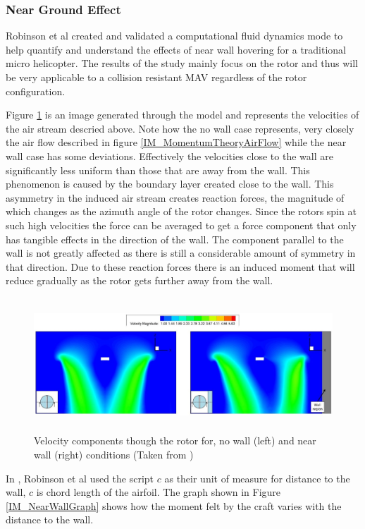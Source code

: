 \subsubsection{Near Ground Effect} \label{SSSECT_NearGroundEffect}
Robinson et al \cite{NearWall} created and validated a computational fluid dynamics mode to help quantify and understand the effects of near wall hovering for a traditional micro helicopter. The results of the study mainly focus on the rotor and thus will be very applicable to a collision resistant MAV regardless of the rotor configuration.

Figure \ref{IM_NearWall} is an image generated through the model and represents the velocities of the air stream descried above. Note how the no wall case represents, very closely the air flow described in figure \ref{IM_MomentumTheoryAirFlow} while the near wall case has some deviations. Effectively the velocities close to the wall are significantly less uniform than those that are away from the wall. This phenomenon is caused by the boundary layer created close to the wall. This asymmetry in the induced air stream creates reaction forces, the magnitude of which changes as the azimuth angle of the rotor changes. Since the rotors spin at such high velocities the force can be averaged to get a force component that only has tangible effects in the direction of the wall. The component parallel to the wall is not greatly affected as there is still a considerable amount of symmetry in that direction. Due to these reaction forces there is an induced moment that will reduce gradually as the rotor gets further away from the wall.  

\begin{figure}[H]
\centering
\includegraphics[height = 5cm]{Images/Literature/NearWall}     
\caption{Velocity components though the rotor for, no wall (left) and near wall (right) conditions (Taken from \cite{NearWall})}
\label{IM_NearWall}
\end{figure}

In \cite{NearWall}, Robinson et al used the script $c$ as their unit of measure for distance to the wall, $c$ is chord length of the airfoil. The graph shown in Figure \ref{IM_NearWallGraph} shows how the moment felt by the craft varies with the distance to the wall.

